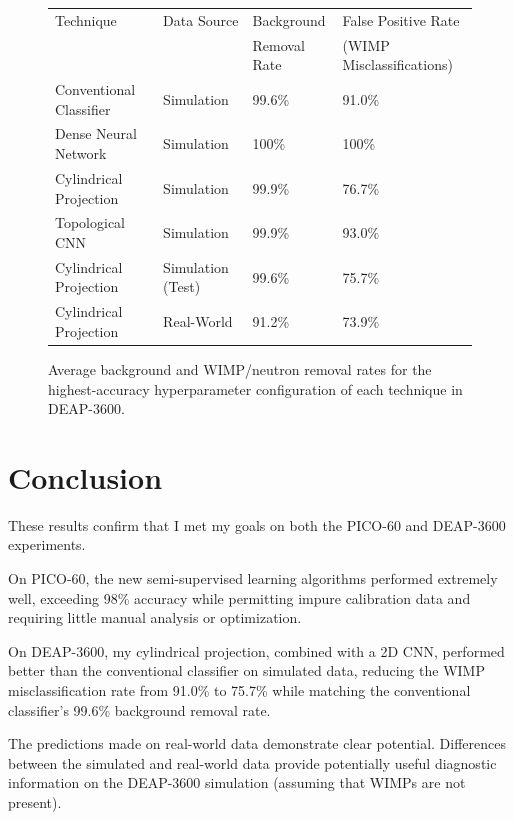 \documentclass[12pt]{article}
\begin{document}
\begin{figure}[ht]
    \centering
    \begin{tabular}[b]{|l|l|l|l|}
        \hline
        \rowcolor{lightcyan}
        Technique & Data Source & Background & False Positive Rate \\
        \rowcolor{lightcyan}
        & & Removal Rate & (WIMP Misclassifications) \\
        \hline
        Conventional Classifier & Simulation & 99.6\% & 91.0\% \\
        \hline
        Dense Neural Network & Simulation & 100\% & 100\% \\
        \hline
        Cylindrical Projection & Simulation & 99.9\% & 76.7\% \\
        \hline
        Topological CNN & Simulation & 99.9\% & 93.0\% \\
        \hline
        Cylindrical Projection & Simulation (Test) & 99.6\% & 75.7\% \\
        \hline
        Cylindrical Projection & Real-World & 91.2\% & 73.9\% \\
        \hline
    \end{tabular}
    \caption{\label{deap_final_results} Average background and WIMP/neutron removal rates for the highest-accuracy hyperparameter configuration of each technique in DEAP-3600.}
\end{figure}

\section{Conclusion}

These results confirm that I met my goals on both the PICO-60 and DEAP-3600 experiments.

On PICO-60, the new semi-supervised learning algorithms performed extremely well, exceeding 98\% accuracy while permitting impure calibration data and requiring little manual analysis or optimization.

On DEAP-3600, my cylindrical projection, combined with a 2D CNN, performed better than the conventional classifier on simulated data, reducing the WIMP misclassification rate from 91.0\% to 75.7\% while matching the conventional classifier's 99.6\% background removal rate.

The predictions made on real-world data demonstrate clear potential. Differences between the simulated and real-world data provide potentially useful diagnostic information on the DEAP-3600 simulation (assuming that WIMPs are not present).
\end{document}
